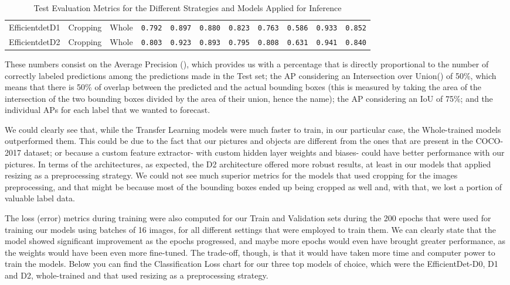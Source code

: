 \documentclass[openright]{normas-utf-tex} %
\begin{document}
\begin{table}[H]
\begin{adjustbox}{width=1\textwidth}
\begin{tabular}{c|c|c|c|c|c|c|c|c|c|c}
		Efficientdet\-D1 & Cropping & Whole & \texttt{0.792} & \texttt{0.897} & \texttt{0.880} & \texttt{0.823} & \texttt{0.763} & \texttt{0.586} & \texttt{0.933} & \texttt{0.852} \\
		Efficientdet\-D2 & Cropping & Whole & \texttt{0.803} & \texttt{0.923} & \texttt{0.893} & \texttt{0.795} & \texttt{0.808} & \texttt{0.631} & \texttt{0.941} & \texttt{0.840} \\
		\hline 
	\end{tabular}
	\end{adjustbox}
	\caption[Test Evaluation Metrics for the Different Strategies and Models Applied for Inference]{Test Evaluation Metrics for the Different Strategies and Models Applied for Inference}
\end{table}

These numbers consist on the Average Precision (), which provides us with 
a percentage that is directly proportional to the number of correctly labeled predictions
among the predictions made in the Test set; the AP considering an 
Intersection over Union() of 50\%, which means that there is 
50\% of overlap between the predicted and the actual bounding boxes (this is measured by 
taking the area of the intersection of the two bounding boxes divided by the area of their union, 
hence the name); the AP considering an IoU of 75\%; and the individual APs for each label that 
we wanted to forecast. 

We could clearly see that, while the Transfer Learning models were much faster to train,
in our particular case, the Whole-trained models outperformed them. This could be 
due to the fact that our pictures and objects are different from the
ones that are present in the COCO-2017 dataset; or because a custom feature extractor- 
with custom hidden layer weights and biases- could have better performance with our pictures. 
In terms of the architectures, as expected, the D2 architecture offered more robust results, at least in
our models that applied resizing as a preprocessing strategy. We could not see much superior metrics for
the models that used cropping for the images preprocessing, and that might be because most of the 
bounding boxes ended up being cropped as well and, with that, we lost a portion of valuable label data. 

The loss (error) metrics during training were also computed for our Train and Validation sets during the 
200 epochs that were used for training our models using batches of 16 images, for all different 
settings that were employed to train them. We can clearly state that the model showed significant
improvement as the epochs progressed, and maybe more epochs would even have brought greater performance,
as the weights would have been even more fine-tuned. The trade-off, though, is that it would have 
taken more time and computer power to train the models.
Below you can find the Classification Loss chart for our three top models of choice, which were
the EfficientDet-D0, D1 and D2, whole-trained and that used resizing as a preprocessing strategy.
\end{document}
